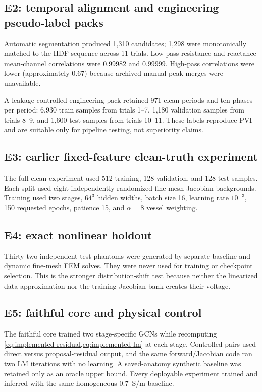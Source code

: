 \documentclass[11pt]{article}
\begin{document}
\subsection{E2: temporal alignment and engineering pseudo-label packs}

Automatic segmentation produced 1,310 candidates; 1,298 were monotonically matched
to the HDF sequence across 11 trials.  Low-pass resistance and reactance mean-channel
correlations were 0.99982 and 0.99999.  High-pass correlations were lower
(approximately 0.67) because archived manual peak merges were unavailable.

A leakage-controlled engineering pack retained 971 clean periods and ten phases
per period: 6,930 train samples from trials 1--7, 1,180 validation samples from
trials 8--9, and 1,600 test samples from trials 10--11.  These labels reproduce
PVI and are suitable only for pipeline testing, not superiority claims.

\subsection{E3: earlier fixed-feature clean-truth experiment}

The full clean experiment used 512 training, 128 validation, and 128 test samples.
Each split used eight independently randomized fine-mesh Jacobian backgrounds.
Training used two stages, $64^3$ hidden widths, batch size 16, learning rate
$10^{-3}$, 150 requested epochs, patience 15, and $\alpha=8$ vessel weighting.

\subsection{E4: exact nonlinear holdout}

Thirty-two independent test phantoms were generated by separate baseline and
dynamic fine-mesh FEM solves.  They were never used for training or checkpoint
selection.  This is the stronger distribution-shift test because neither the
linearized data approximation nor the training Jacobian bank creates their voltage.

\subsection{E5: faithful core and physical control}

The faithful core trained two stage-specific GCNs while recomputing
\cref{eq:implemented-residual,eq:implemented-lm} at each stage.  Controlled pairs
used direct versus proposal-residual output, and the same forward/Jacobian code ran
two LM iterations with no learning.  A saved-anatomy synthetic baseline was retained
only as an oracle upper bound.  Every deployable experiment trained and inferred
with the same homogeneous $0.7$~S/m baseline.
\end{document}

